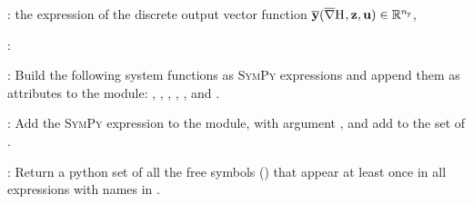\documentclass[10pt,a4paper]{article}
\begin{document}
{\begin{description}
\begin{description}
\item {}: the expression of the discrete output vector function $\overline{{\mathbf{y}}}(\overline{\nabla}{\mathrm{H}}_{\mathtt{}}, {\mathbf{z}}, {\mathbf{u}})\in\mathbb{R}^{n_{\mathtt{y}}}$,
\end{description}
%
\item[Methods]:
%
\begin{description}
%
\item {}: Build the following system functions as \textsc{SymPy} expressions and append them as attributes to the  module: , , , , , and .
%
\item {}: Add the \textsc{SymPy} expression  to the  module, with argument 
, and add  to the set of .
%
\item {}: Return a python set of all the free symbols () that appear at least once in all expressions with names in .
\end{description}
%
\end{description}
%
}
\end{document}
